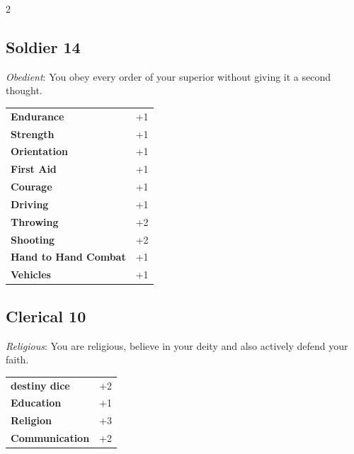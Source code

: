 \begin{multicols}{2}
\begin{tcolorbox}

\end{tcolorbox}

\begin{tcolorbox}
    \subsection*{Soldier \hfill \small{14 }}
    \tcblower
\textit{Obedient}: You obey every order of your superior without giving it a second thought.


\vspace{3mm}

\begin{tabular}{@{}ll@{}}
    \textbf{Endurance} & +1\\
    \textbf{Strength} & +1\\
    \textbf{Orientation} & +1\\
    \textbf{First Aid} & +1\\
    \textbf{Courage} & +1\\
    \textbf{Driving} & +1\\
    \textbf{Throwing} & +2\\
    \textbf{Shooting} & +2\\
    \textbf{Hand to Hand Combat} & +1\\
    \textbf{Vehicles} & +1\\
\end{tabular}


\end{tcolorbox}

\begin{tcolorbox}
    \subsection*{Clerical \hfill \small{10 }}
    \tcblower
\textit{Religious}: You are religious, believe in your deity and also actively defend your faith.


\vspace{3mm}

\begin{tabular}{@{}ll@{}}
    \textbf{destiny dice} & +2\\
    \textbf{Education} & +1\\
    \textbf{Religion} & +3\\
    \textbf{Communication} & +2\\
\end{tabular}


\end{tcolorbox}
\end{multicols}
